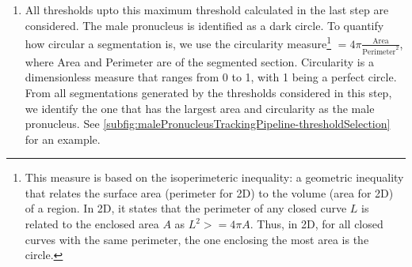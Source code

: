 \begin{enumerate}
    \item All thresholds upto this maximum threshold calculated in the last step are considered. The male pronucleus is identified as a dark circle. To quantify how circular a segmentation is, we use the circularity measure\footnote{This measure is based on the isoperimeteric inequality: a geometric inequality that relates the surface area (perimeter for 2D) to the volume (area for 2D) of a region. In 2D, it states that the perimeter of any closed curve $L$ is related to the enclosed area $A$ as $L^2 >= 4\pi A$. Thus, in 2D, for all closed curves with the same perimeter, the one enclosing the most area is the circle.} $ = 4\pi\frac{\textrm{Area}}{\textrm{Perimeter}^2}$, where Area and Perimeter are of the segmented section. Circularity is a dimensionless measure that ranges from \num{0} to \num{1}, with \num{1} being a perfect circle. From all segmentations generated by the thresholds considered in this step, we identify the one that has the largest area and circularity as the male pronucleus. See \autoref{subfig:malePronucleusTrackingPipeline-thresholdSelection} for an example.
\end{enumerate}

